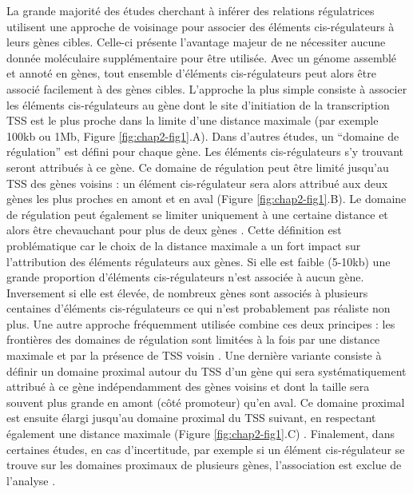 La grande majorité des études cherchant à inférer des relations régulatrices utilisent une approche de voisinage pour associer des éléments \gls{cis}-régulateurs à leurs gènes cibles. Celle-ci présente l’avantage majeur de ne nécessiter aucune donnée moléculaire supplémentaire pour être utilisée. Avec un génome assemblé et annoté en gènes, tout ensemble d’éléments \gls{cis}-régulateurs peut alors être associé facilement à des gènes cibles. L’approche la plus simple consiste à associer les éléments \gls{cis}-régulateurs au gène dont le site d’initiation de la transcription \gls{TSS} est le plus proche dans la limite d’une distance maximale (par exemple 100kb ou 1Mb, Figure \ref{fig:chap2-fig1}.A). Dans d’autres études, un “domaine de régulation” est défini pour chaque gène. Les éléments \gls{cis}-régulateurs s’y trouvant seront attribués à ce gène. Ce domaine de régulation peut être limité jusqu’au \acrshort{TSS} des gènes voisins : un élément \gls{cis}-régulateur sera alors attribué aux deux gènes les plus proches en amont et en aval (Figure \ref{fig:chap2-fig1}.B). Le domaine de régulation peut également se limiter uniquement à une certaine distance et alors être chevauchant pour plus de deux gènes \citep{wong_interplay_2017}. Cette définition est problématique car le choix de la distance maximale a un fort impact sur l'attribution des éléments régulateurs aux gènes. Si elle est faible (5-10kb) une grande proportion d’éléments \gls{cis}-régulateurs n’est associée à aucun gène. Inversement si elle est élevée, de nombreux gènes sont associés à plusieurs centaines d’éléments \gls{cis}-régulateurs ce qui n'est probablement pas réaliste non plus. Une autre approche fréquemment utilisée combine ces deux principes : les frontières des domaines de régulation sont limitées à la fois par une distance maximale et par la présence de \acrshort{TSS} voisin \citep{berthelot_complexity_2018, dukler_phylogenetic_2020}. Une dernière variante consiste à définir un domaine proximal autour du \acrshort{TSS} d’un gène qui sera systématiquement attribué à ce gène indépendamment des gènes voisins et dont la taille sera souvent plus grande en amont (côté promoteur) qu’en aval. Ce domaine proximal est ensuite élargi jusqu’au domaine proximal du \acrshort{TSS} suivant, en respectant également une distance maximale (Figure \ref{fig:chap2-fig1}.C) \citep{berthelot_complexity_2018}. Finalement, dans certaines études, en cas d’incertitude, par exemple si un élément \gls{cis}-régulateur se trouve sur les domaines proximaux de plusieurs gènes, l’association est exclue de l’analyse \citep{dukler_phylogenetic_2020}.\\

